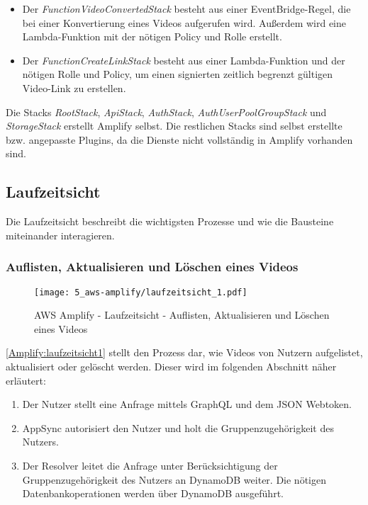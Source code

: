 \begin{itemize}
  \item{Der \textit{FunctionVideoConvertedStack} besteht aus einer EventBridge-Regel, die bei einer Konvertierung eines Videos aufgerufen wird. Außerdem wird eine Lambda-Funktion mit der nötigen Policy und Rolle erstellt.}

  \item{Der \textit{FunctionCreateLinkStack} besteht aus einer Lambda-Funktion und der nötigen Rolle und Policy, um einen signierten zeitlich begrenzt gültigen Video-Link zu erstellen.}
\end{itemize}

Die Stacks \textit{RootStack}, \textit{ApiStack}, \textit{AuthStack}, \textit{AuthUserPoolGroupStack} und \textit{StorageStack} erstellt Amplify selbst. Die restlichen Stacks sind selbst erstellte bzw. angepasste Plugins, da die Dienste nicht vollständig in Amplify vorhanden sind.

\subsection{Laufzeitsicht}

Die Laufzeitsicht beschreibt die wichtigsten Prozesse und wie die Bausteine miteinander interagieren.

\subsubsection{Auflisten, Aktualisieren und Löschen eines Videos}

\begin{figure}
  \centering
  \texttt{[image: 5\_aws-amplify/laufzeitsicht\_1.pdf]}
  \caption{AWS Amplify - Laufzeitsicht - Auflisten, Aktualisieren und Löschen eines Videos}
  \label{Amplify:laufzeitsicht1}
\end{figure}

\autoref{Amplify:laufzeitsicht1} stellt den Prozess dar, wie Videos von Nutzern aufgelistet, aktualisiert oder gelöscht werden. Dieser wird im folgenden Abschnitt näher erläutert:
\begin{enumerate}
  \item{Der Nutzer stellt eine Anfrage mittels GraphQL und dem JSON Webtoken.}
  \item{AppSync autorisiert den Nutzer und holt die Gruppenzugehörigkeit des Nutzers.}
  \item{Der Resolver leitet die Anfrage unter Berücksichtigung der Gruppenzugehörigkeit des Nutzers an DynamoDB weiter. Die nötigen Datenbankoperationen werden über DynamoDB ausgeführt.}
\end{enumerate}

